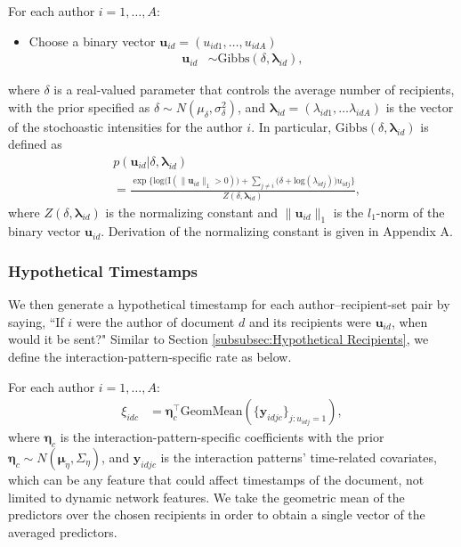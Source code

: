 \documentclass[twoside]{article}
\begin{document}
For each author $i =1,\ldots,A$:
\begin{itemize}
	\item Choose a binary vector $\boldsymbol{u}_{id}= (u_{id1},
	\ldots, u_{idA})$
\begin{align*} \boldsymbol{u}_{id} & \sim
\mbox{Gibbs}(\delta, \boldsymbol{\lambda}_{id}),
\end{align*}
\end{itemize}
	where $\delta$ is a real-valued parameter that controls the average number of recipients, with the prior specified as $\delta \sim N(\mu_\delta,\sigma^2_\delta)$, and $\boldsymbol{\lambda}_{id}=(\lambda_{id1},\ldots\lambda_{idA})$ is the vector of the stochoastic intensities for the author $i$. In particular, $\mbox{Gibbs}(\delta, \boldsymbol{\lambda}_{id})$ is defined as
	\begin{align*}
	&p(\boldsymbol{u}_{id}|\delta, \boldsymbol{\lambda}_{id}) \\&= \frac{\exp\Big\{\mbox{log}\Big(\text{I}( \lVert \boldsymbol{u}_{id}\rVert_1 > 0 )\Big) + \sum_{j \neq i} \Big(\delta+\mbox{log}(\lambda_{idj})\Big)u_{idj}\Big\}}{Z(\delta,\boldsymbol{\lambda}_{id})} ,
	\end{align*}
where $Z(\delta,\boldsymbol{\lambda}_{id})$ is the normalizing constant and $\lVert \boldsymbol{u}_{id}\rVert_1$ is the $l_1$-norm of the binary vector $\boldsymbol{u}_{id}$. Derivation of the normalizing constant is given in Appendix A. 

\subsubsection{Hypothetical Timestamps}\label{subsubsec:Hypothetical Timestamps}
We then generate a hypothetical timestamp for each author--recipient-set pair by saying, ``If $i$ were the author of document $d$ and its recipients were $\boldsymbol{u}_{id}$, when would it be sent?" Similar to Section \ref{subsubsec:Hypothetical Recipients}, we define the interaction-pattern-specific rate as below.

For each author $i =1,\ldots,A$:
\begin{align*}
\xi_{idc}& = \boldsymbol{\eta}_c^\top\mbox{GeomMean}(\{ \boldsymbol{y}_{idjc}\}_{j:u_{idj}= 1}),
\end{align*}
where $\boldsymbol{\eta}_c$ is the interaction-pattern-specific coefficients with the prior $\boldsymbol{\eta}_c \sim N(\boldsymbol{\mu}_\eta,\Sigma_\eta)$, and $\boldsymbol{y}_{idjc}$ is the interaction patterns' time-related covariates, which can be any feature that could affect timestamps of the document, not limited to dynamic network features. We take the geometric mean of the predictors over the chosen recipients in order to obtain a single vector of the averaged predictors. 
\end{document}
